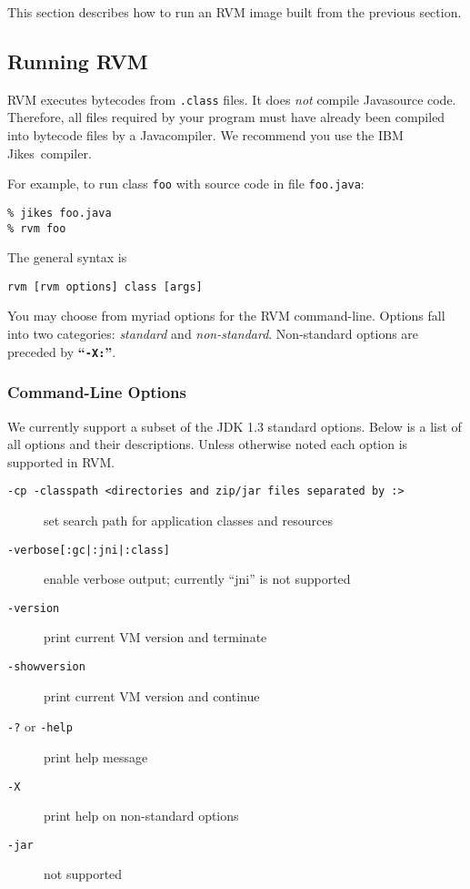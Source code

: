 This section describes how to run an RVM  image built from the previous
section. 

\subsection{Running RVM}

RVM executes bytecodes from {\tt .class} files. It does {\em not} compile
Java\trademark source code. Therefore, all files 
required by your program must have already been compiled into bytecode
files by a Java\trademark compiler.  We recommend you use the IBM Jikes\trademark\ compiler.

For example, to run class {\tt foo} with source code in file {\tt foo.java}:
\begin{verbatim}
% jikes foo.java
% rvm foo 
\end{verbatim}

The general syntax is
\begin{verbatim}
rvm [rvm options] class [args]
\end{verbatim}

You may choose from myriad options for the RVM command-line.  
Options fall into two categories: {\em standard} and {\em
non-standard}.  Non-standard options are preceded by {\bf ``{\tt -X:}''}.

\subsubsection{Command-Line Options}

We currently support a subset of the JDK 1.3 standard options.  Below
is a list of all options and their descriptions.  Unless otherwise noted each
option is supported in RVM.
\begin{description}
\item[{\tt -cp -classpath <directories and zip/jar files separated by :>}]
set search path for application classes and resources

\item[{\tt -verbose[:gc|:jni|:class]}]
enable verbose output; currently ``jni'' is not supported

\item[{\tt -version}] print current VM version and terminate

\item[{\tt -showversion}] print current VM version and continue

\item[{\tt -?} or {\tt -help}] print help message

\item[{\tt -X}] print help on non-standard options

\item[{\tt -jar}] not supported

\end{description}

